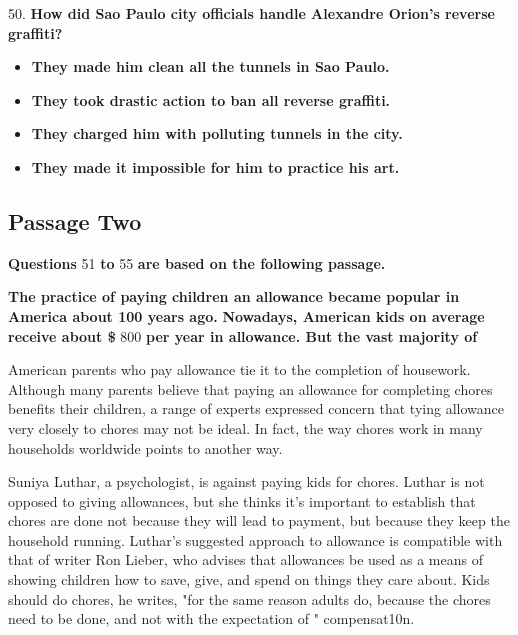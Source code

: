 \documentclass[UTF8,11pt]{ctexart}
\begin{document}
50.\textbf{ How did Sao Paulo city officials handle Alexandre Orion's reverse graffiti?}


\begin{itemize}[leftmargin=2em,itemsep=.2em,topsep=.4em]\item[A.] \textbf{They made him clean all the tunnels in Sao Paulo.}
\item[B.] \textbf{They took drastic action to ban all reverse graffiti.}
\item[C.] \textbf{They charged him with polluting tunnels in the city.}
\item[D.] \textbf{They made it impossible for him to practice his art.}
\end{itemize}

\subsection*{\textbf{Passage Two}}


\textbf{Questions }51 \textbf{to }55 \textbf{are based on the following passage.}


\textbf{The practice of paying children an allowance became popular in America about 100 years ago.} \textbf{Nowadays, American kids on average receive about \$ }800 \textbf{per year in allowance. But the vast majority of}


American parents who pay allowance tie it to the completion of housework. Although many parents believe that paying an allowance for completing chores benefits their children, a range of experts expressed concern that tying allowance very closely to chores may not be ideal. In fact, the way chores work in many households worldwide points to another way.


Suniya Luthar, a psychologist, is against paying kids for chores. Luthar is not opposed to giving allowances, but she thinks it's important to establish that chores are done not because they will lead to payment, but because they keep the household running. Luthar's suggested approach to allowance is compatible with that of writer Ron Lieber, who advises that allowances be used as a means of showing children how to save, give, and spend on things they care about. Kids should do chores, he writes, "for the same reason adults do, because the chores need to be done, and not with the expectation of " compensat10n.
\end{document}

